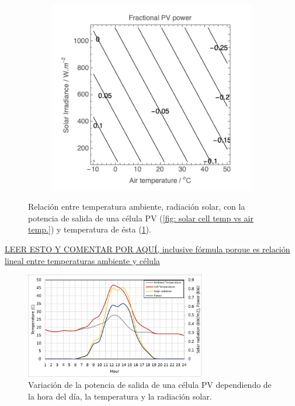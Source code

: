 \documentclass[12pt]{article}
\begin{document}
\begin{figure}[h]
\begin{subfigure}{0.55\textwidth}
			\includegraphics[width=1\linewidth]{img/powerPVCell_airTemp.png}
			\caption{}
			\label{fig:power output of a solar cell vs air temp.}
		\end{subfigure}
		\caption{Relación entre temperatura ambiente, radiación solar, con la potencia de salida de una célula PV (\ref{fig: solar cell temp vs air temp.}) y temperatura de ésta (\ref{fig:power output of a solar cell vs air temp.}).}
		\label{fig:solar temp}
	\end{figure}
	
	\pagebreak
	
	\noindent \href{https://www.qpvgroup.org/blog/2019/2/3/how-does-air-temperature-affect-photovoltaic-solar-panel-output}{LEER ESTO Y COMENTAR POR AQUÍ, inclusive fórmula porque es relación lineal entre temperaturas ambiente y célula} \\
	
	\begin{figure}[h]
		\begin{center}
			\includegraphics[width=0.7\textwidth]{img/cellTemp_ambTemp_Irrad_Pow.png}
			\caption{Variación de la potencia de salida de una célula PV dependiendo de la hora del día, la temperatura y la radiación solar.}
			\label{fig:cellTemp_ambTemp_Irrad_Pow}
		\end{center}
	\end{figure}
	
\end{document}
